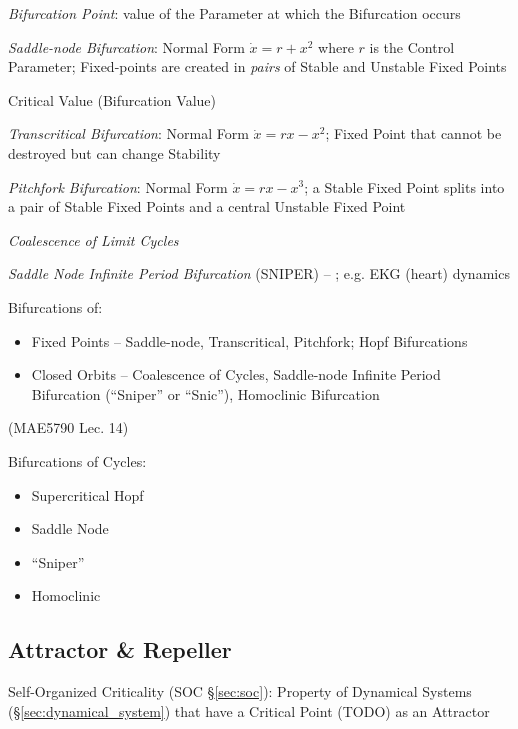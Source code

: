 \emph{Bifurcation Point}: value of the Parameter at which the Bifurcation
occurs

\emph{Saddle-node Bifurcation}: Normal Form $\dot{x} = r + x^2$ where $r$ is
the Control Parameter;
Fixed-points are created in \emph{pairs} of Stable and Unstable Fixed Points


Critical Value (Bifurcation Value)

\emph{Transcritical Bifurcation}: Normal Form $\dot{x} = rx - x^2$; Fixed Point
that cannot be destroyed but can change Stability

\emph{Pitchfork Bifurcation}: Normal Form $\dot{x} = rx - x^3$; a Stable Fixed
Point splits into a pair of Stable Fixed Points and a central Unstable Fixed
Point

\emph{Coalescence of Limit Cycles}

\emph{Saddle Node Infinite Period Bifurcation} (SNIPER) -- ; e.g. EKG (heart)
dynamics

Bifurcations of:
\begin{itemize}
  \item Fixed Points -- Saddle-node, Transcritical, Pitchfork; Hopf Bifurcations
  \item Closed Orbits -- Coalescence of Cycles,
    Saddle-node Infinite Period Bifurcation (``Sniper'' or ``Snic''),
    Homoclinic Bifurcation
\end{itemize}

(MAE5790 Lec. 14)

Bifurcations of Cycles:
\begin{itemize}
  \item Supercritical Hopf
  \item Saddle Node
  \item ``Sniper''
  \item Homoclinic
\end{itemize}



\subsection{Attractor \& Repeller}\label{sec:attractor_repeller}

\fist Self-Organized Criticality (SOC \S\ref{sec:soc}): Property of Dynamical
Systems (\S\ref{sec:dynamical_system}) that have a Critical Point (TODO) as an
Attractor


